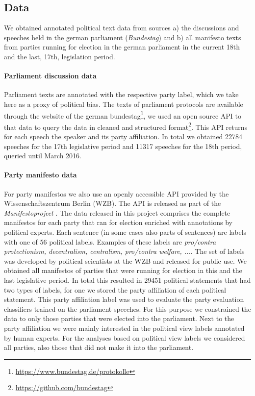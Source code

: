 \documentclass[runningheads,a4paper]{llncs}
\begin{document}
\subsection{Data}
We obtained annotated political text data from sources a) the discussions and speeches held in the german parliament ({\em Bundestag}) and b) all manifesto texts from parties running for election in the german parliament in the current 18th and the last, 17th, legislation period.

\paragraph{Parliament discussion data} Parliament texts are annotated with the respective party label, which we take here as a proxy of political bias. The texts of parliament protocols are available through the website of the german bundestag\footnote{\url{https://www.bundestag.de/protokolle}}, we used an open source API to that data to query the data in cleaned and structured format\footnote{\url{https://github.com/bundestag}}. This API returns for each speech the speaker and its party affiliation. In total we obtained 22784 speeches for the 17th legislative period and 11317 speeches for the 18th period, queried until March 2016. 

\paragraph{Party manifesto data}
For party manifestos we also use an openly accessible API provided by the Wissenschaftszentrum Berlin (WZB). The API is released as part of the {\em Manifestoproject} \cite{manifesto}. The data released in this project comprises the complete manifestos for each party that ran for election enriched with annotations by political experts. Each sentence (in some cases also parts of sentences) are labels with one of 56 political labels. Examples of these labels are {\em pro/contra protectionism, decentralism, centralism, pro/contra welfare, ...}. The set of labels was developed by political scientists at the WZB and released for public use. We obtained all manifestos of parties that were running for election in this and the last legislative period. In total this resulted in 29451 political statements that had two types of labels, for one we stored the party affiliation of each political statement. This party affiliation label was used to evaluate the party evaluation classifiers trained on the parliament speeches. For this purpose we constrained the data to only those parties that were elected into the parliament. Next to the party affiliation we were mainly interested in the political view labels annotated by human experts. For the analyses based on political view labels we considered all parties, also those that did not make it into the parliament. 
\end{document}
